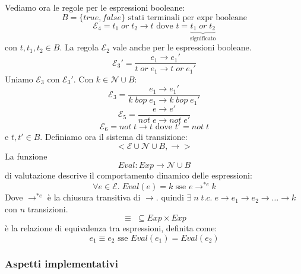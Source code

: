 \documentclass[a4paper]{article}
\begin{document}
\noindent
Vediamo ora le regole per le espressioni booleane:
\[
  B = \{true, false\} \text{ stati terminali per expr booleane}
\]
\[
  \mathcal{E}_4 = t_1 \; or \; t_2 \to t \text{ dove } 
  t = \underbrace{t_1 \; or \; t_2}_{\text{significato}}
\]
con $t, t_1, t_2 \in B$.
La regola $\mathcal{E}_2$ vale anche per le espressioni booleane. 
\[
  \mathcal{E}_3' = \frac{e_1 \to e_1'}{t \; or \; e_1 \to t \; or \; e_1'}
\]
Uniamo $\mathcal{E}_3$ con $\mathcal{E}_3'$. Con $k \in \mathcal{N} \cup B$:
\[
  \mathcal{E}_3 =\frac{e_1 \to e_1'}{k \; bop \; e_{1} \to k \; bop \; e_1'}
\]
\[
  \mathcal{E}_5 = \frac{e \to e'}{not \; e \to not \; e'}
\]
\[
  \mathcal{E}_6 = not \; t \to t \text{ dove } t' = not \; t 
\]
e $t,t' \in B$.
Definiamo ora il sistema di transizione:
\[
  < \mathcal{E} \cup \mathcal{N} \cup B,\to >
\]
{
  La funzione 
  \[
    Eval : Exp \to \mathcal{N} \cup B 
  \]
  di valutazione descrive il comportamento dinamico delle espressioni:
  \[
    \forall e \in \mathcal{E} .\; Eval(e) = k \text{ sse } e \to^{*e} k  
  \]
  Dove $\to^{*e}$ è la chiusura transitiva di $\to$. quindi $\exists \;n\; t.c. \; e \to e_1 \to e_2 \to \dots \to k$ con
  $n$ transizioni.
}
{
 \[\equiv \; \subseteq Exp \times Exp\]
 è la relazione di equivalenza tra espressioni, definita come:
 \[
  e_1 \equiv e_2 \text{ sse } Eval(e_1) = Eval(e_2)
 \]
}

\subsubsection{Aspetti implementativi}
\end{document}
